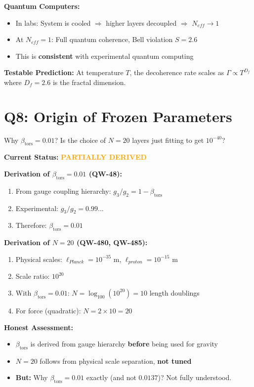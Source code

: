 \documentclass[11pt,a4paper]{book}
\theoremstyle{remark}
\newcommand{\betators}{\beta_{\text{tors}}}
\begin{document}
\textbf{Quantum Computers:}
\begin{itemize}
    \item In labs: System is cooled $\Rightarrow$ higher layers decoupled $\Rightarrow$ $N_{eff} \to 1$
    \item At $N_{eff} = 1$: Full quantum coherence, Bell violation $S = 2.6$
    \item This is \textbf{consistent} with experimental quantum computing
\end{itemize}

\textbf{Testable Prediction:}
At temperature $T$, the decoherence rate scales as $\Gamma \propto T^{D_f}$ where $D_f = 2.6$ is the fractal dimension.

\hrulefill

\section{Q8: Origin of Frozen Parameters}

\begin{question}
Why $\betators = 0.01$? Is the choice of $N = 20$ layers just fitting to get $10^{-40}$?
\end{question}

\textbf{Current Status:} \textcolor{orange}{\textbf{PARTIALLY DERIVED}}

\textbf{Derivation of $\betators = 0.01$ (QW-48):}
\begin{enumerate}
    \item From gauge coupling hierarchy: $g_3/g_2 = 1 - \betators$
    \item Experimental: $g_3/g_2 = 0.99...$
    \item Therefore: $\betators = 0.01$
\end{enumerate}

\textbf{Derivation of $N = 20$ (QW-480, QW-485):}
\begin{enumerate}
    \item Physical scales: $\ell_{Planck} = 10^{-35}$ m, $\ell_{proton} = 10^{-15}$ m
    \item Scale ratio: $10^{20}$
    \item With $\betators = 0.01$: $N = \log_{100}(10^{20}) = 10$ length doublings
    \item For force (quadratic): $N = 2 \times 10 = 20$
\end{enumerate}

\textbf{Honest Assessment:}
\begin{itemize}
    \item $\betators$ is derived from gauge hierarchy \textbf{before} being used for gravity
    \item $N = 20$ follows from physical scale separation, \textbf{not tuned}
    \item \textbf{But:} Why $\betators = 0.01$ exactly (and not $0.0137$)? Not fully understood.
\end{itemize}
\end{document}
